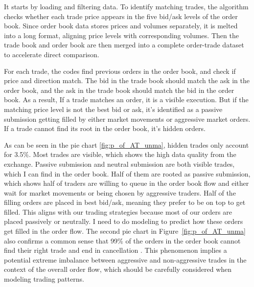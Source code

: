 It starts by loading and filtering data. To identify matching trades, the algorithm checks whether each trade price appears in the five bid/ask levels of the order book. Since order book data stores prices and volumes separately, it is melted into a long format, aligning price levels with corresponding volumes. Then the trade book and order book are then merged into a complete order-trade dataset to accelerate direct comparison.

For each trade, the codes find previous orders in the order book, and check if price and direction match. The bid in the trade book should match the ask in the order book, and the ask in the trade book should match the bid in the order book. As a result, If a trade matches an order, it is a visible execution. But if the matching price level is not the best bid or ask, it's identified as a passive submission getting filled by either market movements or aggressive market orders. If a trade cannot find its root in the order book, it's hidden orders.

As can be seen in the pie chart \ref{fig:p_of_AT_unma}, hidden trades only account for 3.5\%. Most trades are visible, which shows the high data quality from the exchange. Passive submission and neutral submission are both visible trades, which I can find in the order book. Half of them are rooted as passive submission, which shows half of traders are willing to queue in the order book flow and either wait for market movements or being chosen by aggressive traders. Half of the filling orders are placed in best bid/ask, meaning they prefer to be on top to get filled. This aligns with our trading strategies because most of our orders are placed passively or neutrally. I need to do modeling to predict how these orders get filled in the order flow. The second pie chart in Figure~\ref{fig:p_of_AT_unma} also confirms a common sense that 99\% of the orders in the order book cannot find their right trade and end in cancellation \citep{gould_limit_2013}. This phenomenon implies a potential extreme imbalance between aggressive and non-aggressive trades in the context of the overall order flow, which should be carefully considered when modeling trading patterns.

